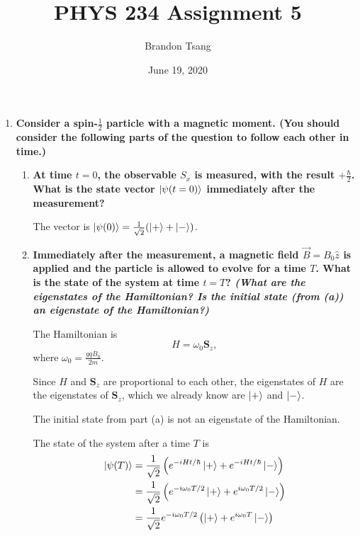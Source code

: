 \documentclass[11pt]{article}
\title{PHYS 234 Assignment 5}
\author{Brandon Tsang}
\date{June 19, 2020}
\begin{document}
    \maketitle
    \begin{enumerate}[label=\textbf{\arabic*.}]
        \item{
            \textbf{\boldmath Consider a spin-\(\frac 1 2\) particle with a magnetic moment. (You should consider the following parts of the question to follow each other in time.)}
            \begin{enumerate}[label=\textbf{(\alph*)}]
                \item{
                    \textbf{\boldmath At time \(t=0\), the observable \(S_x\) is measured, with the result \(+\frac \hbar 2\). What is the state vector \(\ket{\psi(t=0)}\) immediately after the measurement?}
                    \par
                    The vector is \(\ket{\psi(0)}=\frac{1}{\sqrt 2}(\ket{+}+\ket{-})\).
                }
                \item{
                    \textbf{\boldmath Immediately after the measurement, a magnetic field \(\vec{B}=B_0\hat{z}\) is applied and the particle is allowed to evolve for a time \(T\). What is the state of the system at time \(t=T\)? \textit{(What are the eigenstates of the Hamiltonian? Is the initial state (from (a)) an eigenstate of the Hamiltonian?)}}
                    \par
                    The Hamiltonian is \[H=\omega_0\mathbf{S}_z,\] where \(\omega_0=\frac{gqB_0}{2m}\).
                    \par
                    Since \(H\) and \(\mathbf{S}_z\) are proportional to each other, the eigenstates of \(H\) are the eigenstates of \(\mathbf{S}_z\), which we already know are \(\ket{+}\) and \(\ket{-}\).
                    \par
                    The initial state from part (a) is not an eigenstate of the Hamiltonian.
                    \par
                    The state of the system after a time \(T\) is
                    \begin{align*}
                        \ket{\psi(T)}&=\frac{1}{\sqrt 2}\left(e^{-iHt/\hbar}\ket{+}+e^{-iHt/\hbar}\ket{-}\right) \\
                        &=\frac{1}{\sqrt 2}\left(e^{-i\omega_0T/2}\ket{+}+e^{i\omega_0T/2}\ket{-}\right) \\
                        &=\frac{1}{\sqrt 2}e^{-i\omega_0T/2}\left(\ket{+}+e^{i\omega_0T}\ket{-}\right)

\end{align*}}
\end{enumerate}}
\end{enumerate}
\end{document}
